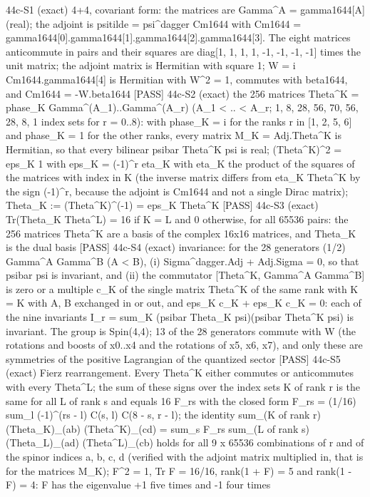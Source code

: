 \documentclass[
  10pt,
]{article}
\newenvironment{Shaded}{}{}
\newcommand{\NormalTok}[1]{#1}
\begin{document}
\begin{Shaded}
\begin{Highlighting}[]
\NormalTok{[PASS] 44c{-}S1  (exact) 4+4, covariant form: the matrices are Gamma\^{}A = gamma1644[A] (real); the adjoint is psitilde = psi\^{}dagger Cm1644 with Cm1644 = gamma1644[0].gamma1644[1].gamma1644[2].gamma1644[3]. The eight matrices anticommute in pairs and their squares are diag[1, 1, 1, 1, {-}1, {-}1, {-}1, {-}1] times the unit matrix; the adjoint matrix is Hermitian with square 1; W = i Cm1644.gamma1644[4] is Hermitian with W\^{}2 = 1, commutes with beta1644, and Cm1644 = {-}W.beta1644}
\NormalTok{[PASS] 44c{-}S2  (exact) the 256 matrices Theta\^{}K = phase\_K Gamma\^{}(A\_1)..Gamma\^{}(A\_r) (A\_1 \textless{} .. \textless{} A\_r; 1, 8, 28, 56, 70, 56, 28, 8, 1 index sets for r = 0..8): with phase\_K = i for the ranks r in [1, 2, 5, 6] and phase\_K = 1 for the other ranks, every matrix M\_K = Adj.Theta\^{}K is Hermitian, so that every bilinear psibar Theta\^{}K psi is real; (Theta\^{}K)\^{}2 = eps\_K 1 with eps\_K = ({-}1)\^{}r eta\_K with eta\_K the product of the squares of the matrices with index in K (the inverse matrix differs from eta\_K Theta\^{}K by the sign ({-}1)\^{}r, because the adjoint is Cm1644 and not a single Dirac matrix); Theta\_K := (Theta\^{}K)\^{}({-}1) = eps\_K Theta\^{}K}
\NormalTok{[PASS] 44c{-}S3  (exact) Tr(Theta\_K Theta\^{}L) = 16 if K = L and 0 otherwise, for all 65536 pairs: the 256 matrices Theta\^{}K are a basis of the complex 16x16 matrices, and Theta\_K is the dual basis}
\NormalTok{[PASS] 44c{-}S4  (exact) invariance: for the 28 generators (1/2) Gamma\^{}A Gamma\^{}B (A \textless{} B), (i) Sigma\^{}dagger.Adj + Adj.Sigma = 0, so that psibar psi is invariant, and (ii) the commutator [Theta\^{}K, Gamma\^{}A Gamma\^{}B] is zero or a multiple c\_K of the single matrix Theta\^{}K\textquotesingle{} of the same rank with K\textquotesingle{} = K with A, B exchanged in or out, and eps\_K c\_K + eps\_K\textquotesingle{} c\_K\textquotesingle{} = 0: each of the nine invariants I\_r = sum\_K (psibar Theta\_K psi)(psibar Theta\^{}K psi) is invariant. The group is Spin(4,4); 13 of the 28 generators commute with W (the rotations and boosts of x0..x4 and the rotations of x5, x6, x7), and only these are symmetries of the positive Lagrangian of the quantized sector}
\NormalTok{[PASS] 44c{-}S5  (exact) Fierz rearrangement. Every Theta\^{}K either commutes or anticommutes with every Theta\^{}L; the sum of these signs over the index sets K of rank r is the same for all L of rank s and equals 16 F\_rs with the closed form F\_rs = (1/16) sum\_l ({-}1)\^{}(rs {-} l) C(s, l) C(8 {-} s, r {-} l); the identity sum\_(K of rank r) (Theta\_K)\_(ab) (Theta\^{}K)\_(cd) = sum\_s F\_rs sum\_(L of rank s) (Theta\_L)\_(ad) (Theta\^{}L)\_(cb) holds for all 9 x 65536 combinations of r and of the spinor indices a, b, c, d (verified with the adjoint matrix multiplied in, that is for the matrices M\_K); F\^{}2 = 1, Tr F = 16/16, rank(1 + F) = 5 and rank(1 {-} F) = 4: F has the eigenvalue +1 five times and {-}1 four times}

\end{Highlighting}
\end{Shaded}
\end{document}

